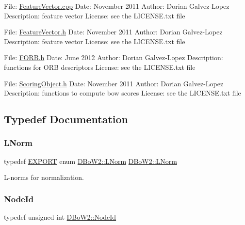 File\+: \mbox{\hyperlink{_feature_vector_8cpp}{Feature\+Vector.\+cpp}} Date\+: November 2011 Author\+: Dorian Galvez-\/\+Lopez Description\+: feature vector License\+: see the L\+I\+C\+E\+N\+S\+E.\+txt file

File\+: \mbox{\hyperlink{_feature_vector_8h}{Feature\+Vector.\+h}} Date\+: November 2011 Author\+: Dorian Galvez-\/\+Lopez Description\+: feature vector License\+: see the L\+I\+C\+E\+N\+S\+E.\+txt file

File\+: \mbox{\hyperlink{_f_o_r_b_8h}{F\+O\+R\+B.\+h}} Date\+: June 2012 Author\+: Dorian Galvez-\/\+Lopez Description\+: functions for O\+RB descriptors License\+: see the L\+I\+C\+E\+N\+S\+E.\+txt file

File\+: \mbox{\hyperlink{_scoring_object_8h}{Scoring\+Object.\+h}} Date\+: November 2011 Author\+: Dorian Galvez-\/\+Lopez Description\+: functions to compute bow scores License\+: see the L\+I\+C\+E\+N\+S\+E.\+txt file 

\subsection{Typedef Documentation}
\mbox{\label{namespace_d_bo_w2_a350a8bb9e38231cbf68ef07399d7a0c8}} 
\subsubsection{\texorpdfstring{L\+Norm}{LNorm}}
{\footnotesize\ttfamily typedef \mbox{\hyperlink{config_8h_a3472d8cdbb788d5f1815b3522595bc49}{E\+X\+P\+O\+RT}} enum \mbox{\hyperlink{namespace_d_bo_w2_a53e9e0bcfc25c861815e413a7cf3fa51}{D\+Bo\+W2\+::\+L\+Norm}}  \mbox{\hyperlink{namespace_d_bo_w2_a53e9e0bcfc25c861815e413a7cf3fa51}{D\+Bo\+W2\+::\+L\+Norm}}}



L-\/norms for normalization. 

\mbox{\label{namespace_d_bo_w2_a3a0fa9c50c0df508759362d6204566f2}} 
\subsubsection{\texorpdfstring{Node\+Id}{NodeId}}
{\footnotesize\ttfamily typedef unsigned int \mbox{\hyperlink{namespace_d_bo_w2_a3a0fa9c50c0df508759362d6204566f2}{D\+Bo\+W2\+::\+Node\+Id}}}



